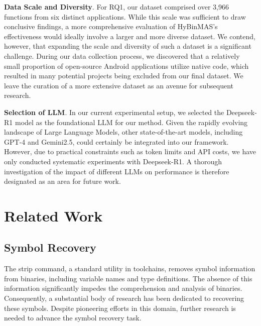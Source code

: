 \documentclass[acmsmall,screen,review,anonymous]{acmart} %
\begin{document}
\textbf{Data Scale and Diversity}. For RQ1, our dataset comprised over 3,966 functions from six distinct applications. While this scale was sufficient to draw conclusive findings, a more comprehensive evaluation of HyBinMAS's effectiveness would ideally involve a larger and more diverse dataset. We contend, however, that expanding the scale and diversity of such a dataset is a significant challenge. During our data collection process, we discovered that a relatively small proportion of open-source Android applications utilize native code, which resulted in many potential projects being excluded from our final dataset. We leave the curation of a more extensive dataset as an avenue for subsequent research.

\textbf{Selection of LLM}. In our current experimental setup, we selected the Deepseek-R1 model as the foundational LLM for our method. Given the rapidly evolving landscape of Large Language Models, other state-of-the-art models, including GPT-4\cite{GPT} and Gemini2.5\cite{Gemini}, could certainly be integrated into our framework. However, due to practical constraints such as token limits and API costs, we have only conducted systematic experiments with Deepseek-R1. A thorough investigation of the impact of different LLMs on performance is therefore designated as an area for future work.



\section{Related Work}
\subsection{Symbol Recovery}

The strip command, a standard utility in toolchains, removes symbol information from binaries, including variable names and type definitions. The absence of this information significantly impedes the comprehension and analysis of binaries. Consequently, a substantial body of research has been dedicated to recovering these symbols. Despite pioneering efforts in this domain\cite{DeBin, DIRE, NERO, NFRE, Punstrip, DIRTY}, further research is needed to advance the symbol recovery task.
\end{document}

